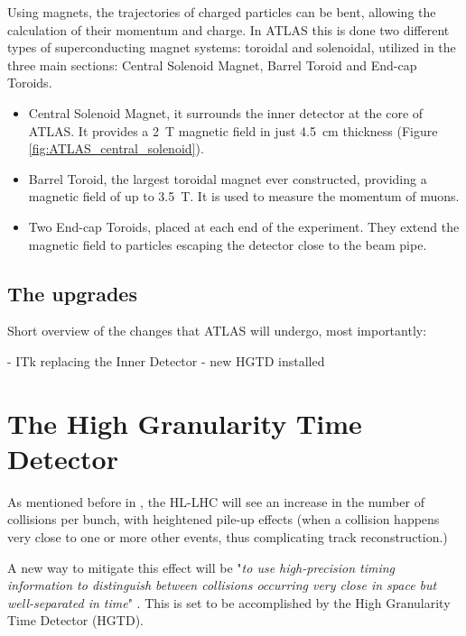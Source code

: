 Using magnets, the trajectories of charged particles can be bent, allowing the calculation of their momentum and charge. In ATLAS this is done two different types of superconducting magnet systems: toroidal and solenoidal, utilized in the three main sections: Central Solenoid Magnet, Barrel Toroid and End-cap Toroids.
\begin{itemize}
    \item Central Solenoid Magnet, it surrounds the inner detector at the core of ATLAS. It provides a \qty{2}{\tesla} magnetic field in just \qty{4.5}{\centi\meter} thickness (Figure \ref{fig:ATLAS_central_solenoid}).
    \item Barrel Toroid, the largest toroidal magnet ever constructed, providing a magnetic field of up to \qty{3.5}{\tesla}. It is used to measure the momentum of muons.
    \item Two End-cap Toroids, placed at each end of the experiment. They extend the magnetic field to particles escaping the detector close to the beam pipe.
\end{itemize}

\subsection{The upgrades}
Short overview of the changes that ATLAS will undergo, most importantly:

- ITk replacing the Inner Detector
- new HGTD installed

\section{The High Granularity Time Detector}\label{sec:HGTD}

As mentioned before in , the HL-LHC will see an increase in the number of collisions per bunch, with heightened pile-up effects (when a collision happens very close to one or more other events, thus complicating track reconstruction.) 
 
A new way to mitigate this effect will be "\textit{to use high-precision timing information to distinguish between collisions occurring very close in space but well-separated in time}" \cite{CERN-LHCC-2020-007}. This is set to be accomplished by the High Granularity Time Detector (HGTD).


